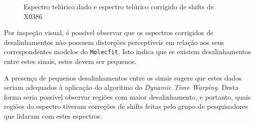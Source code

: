 \begin{figure}[htb]
  \centering
  \hfill
  \caption{Espectro telúrico dado e espectro telúrico corrigido de shifts de X0386}
  \label{fig:x0386-gt-telluric}
\end{figure}

Por inspeção visual, é possível observar que os espectros corrigidos de desalinhamentos não possuem distorções perceptíveis em relação aos seus correspondentes modelos do \texttt{Molecfit}. Isto indica que se existem desalinhamentos entre estes sinais, estes devem ser pequenos. 

A presença de pequenos desalinhamentos entre os sinais sugere que estes dados seriam adequados à aplicação do algoritmo do \textit{Dynamic Time Warping}. Desta forma seria possível observar regiões com maior desalinhamento, e portanto, quais regiões do espectro tiveram correções de shifts feitas pelo grupo de pesquisadores que lidaram com estes espectros.

